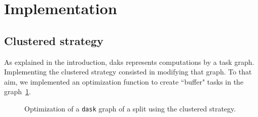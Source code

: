 \documentclass[conference]{IEEEtran}
\begin{document}
\section{Implementation}

\subsection{Clustered strategy}

As explained in the introduction, daks represents computations by a task graph.
Implementing the clustered strategy consisted in modifying that graph. To that
aim, we implemented an optimization function to create ``buffer" tasks in the
graph~\ref{fig:bufferization}.

\begin{figure}
  \centering

  \qquad

  \caption{Optimization of a \texttt{dask} graph of a split using the clustered strategy.}
  \label{fig:bufferization}

\end{figure}
\end{document}
